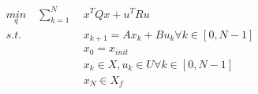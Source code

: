 \documentclass[preview]{standalone}
\begin{document}
\begin{align*}
\underset{q}{min}  \quad \sum_{k=1}^N \; &x^TQx + u^T R u \\ s.t. \quad &x_{k+1} = Ax_k + Bu_k \forall k \in [0, N-1] \\ &x_0 = x_{init} \\ &x_k \in X, u_k \in U \forall k \in [0, N-1] \\ &x_N \in X_f
\end{align*}
\end{document}
